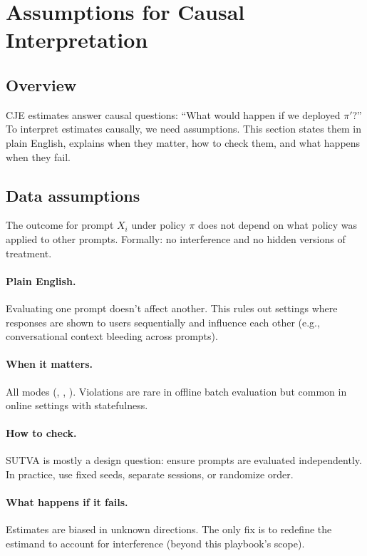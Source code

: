\section{Assumptions for Causal Interpretation}

\subsection{Overview}

CJE estimates answer causal questions: ``What would happen if we deployed $\pi'$?'' To interpret estimates causally, we need assumptions. This section states them in plain English, explains when they matter, how to check them, and what happens when they fail.

\subsection{Data assumptions}

\begin{assumption}
\label{assum:sutva}
The outcome for prompt $X_i$ under policy $\pi$ does not depend on what policy was applied to other prompts. Formally: no interference and no hidden versions of treatment.
\end{assumption}

\paragraph{Plain English.} Evaluating one prompt doesn't affect another. This rules out settings where responses are shown to users sequentially and influence each other (e.g., conversational context bleeding across prompts).

\paragraph{When it matters.} All modes (\dm, \ips, \dr). Violations are rare in offline batch evaluation but common in online settings with statefulness.

\paragraph{How to check.} SUTVA is mostly a design question: ensure prompts are evaluated independently. In practice, use fixed seeds, separate sessions, or randomize order.

\paragraph{What happens if it fails.} Estimates are biased in unknown directions. The only fix is to redefine the estimand to account for interference (beyond this playbook's scope).

